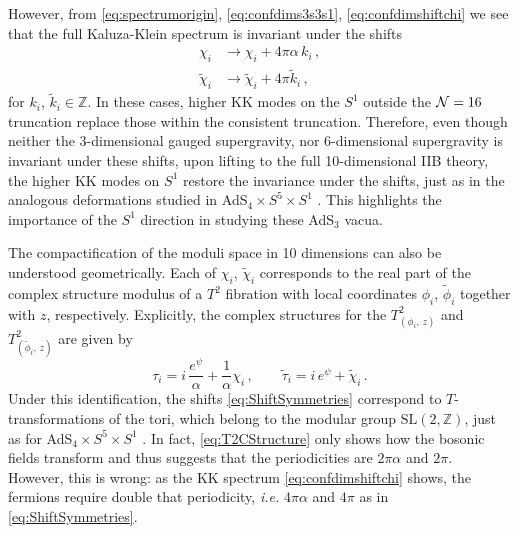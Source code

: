 \documentclass[a4paper, 11pt]{article}
\numberwithin{equation}{section}
\newcommand{\ts}[1]{\widetilde{#1}}
\newcommand{\SL}[1]{\mathrm{SL}( #1 )}
\newcommand{\+}{\oplus}
\begin{document}
However, from  \eqref{eq:spectrumorigin}, \eqref{eq:confdims3s3s1}, \eqref{eq:confdimshiftchi} we see that the full Kaluza-Klein spectrum is invariant under the shifts
\begin{equation} \label{eq:ShiftSymmetries}
	\begin{split}
		\chi_i &\rightarrow \chi_i + 4\pi\alpha\, k_i\,, \\
		\ts{\chi}_i &\rightarrow \ts{\chi}_i + 4\pi \ts{k}_i \,,
	\end{split}
\end{equation}
for $k_i$, $\ts{k}_i \in \mathbb{Z}$. In these cases, higher KK modes on the $S^1$ outside the ${\cal N}=16$ truncation replace those within the consistent truncation. Therefore, even though neither the 3-dimensional gauged supergravity, nor 6-dimensional supergravity is invariant under these shifts, upon lifting to the full 10-dimensional IIB theory, the higher KK modes on $S^1$ restore the invariance under the shifts, just as in the analogous deformations studied in AdS$_4 \times S^5 \times S^1$ \cite{Giambrone:2021zvp,Giambrone:2021wsm}. This highlights the importance of the $S^1$ direction in studying these AdS$_3$ vacua.

The compactification of the moduli space in 10 dimensions can also be understood geometrically. Each of $\chi_i$, $\ts{\chi}_i$ corresponds to the real part of the complex structure modulus of a $T^2$ fibration with local coordinates $\phi_i$, $\ts{\phi}_i$ together with $z$, respectively. Explicitly, the complex structures for the $T^2_{(\phi_i,\, z)}$ and $T^2_{(\ts{\phi}_i,\, z)}$ are given by
\begin{equation} \label{eq:T2CStructure}
	\tau_i = i\,\frac{e^\psi}{\alpha} + \frac1\alpha \chi_i \,, \qquad \ts{\tau}_i = i\,e^\psi + \ts{\chi}_i \,.
\end{equation}
Under this identification, the shifts \eqref{eq:ShiftSymmetries} correspond to $T$-transformations of the tori, which belong to the modular group $\SL{2,\mathbb{Z}}$, just as for AdS$_4 \times S^5 \times S^1$ \cite{Giambrone:2021zvp,Giambrone:2021wsm}. In fact, \eqref{eq:T2CStructure} only shows how the bosonic fields transform and thus suggests that the periodicities are $2\pi\alpha$ and $2\pi$. However, this is wrong: as the KK spectrum \eqref{eq:confdimshiftchi} shows, the fermions require double that periodicity, \textit{i.e.} $4\pi\alpha$ and $4\pi$ as in \eqref{eq:ShiftSymmetries}.
\end{document}
